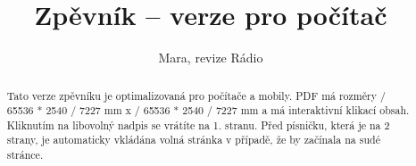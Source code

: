 \documentclass[twoside,
			   11pt,					%
			   notitlepage]
			   {article}
\author{Mara, revize Rádio} 							%
\title{Zpěvník -- verze pro počítač}	%
\newcommand*\getlength[1]{\number\numexpr#1 / 65536 * 2540 / 7227} %
\newcommand{\add}[1]{}				%
\begin{document}

\maketitle
\label{obsah}


\begin{abstract}
\noindent
Tato verze zpěvníku je optimalizovaná pro počítače a mobily. 
PDF má rozměry \getlength{\paperwidth} mm x \getlength{\paperheight} mm
 a má interaktivní klikací obsah. Kliknutím na libovolný nadpis se vrátíte na 1. stranu. 
Před písničku, která je na 2 strany, je automaticky vkládána volná stránka v případě, že by začínala na sudé stránce.
\end{abstract}

\pagestyle{plain}	%

\tableofcontents

\pagestyle{plain}

\end{document}
